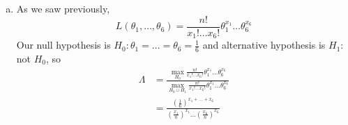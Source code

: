 \begin{enumerate}[a)]
    \item As we saw previously, 
    \[
        L(\theta_1, \dots, \theta_6) = \frac{n!}{x_1! \dots x_6!}\theta_1^{x_1} \dots \theta_6^{x_6}
    \]
    Our null hypothesis is $H_0\colon \theta_1 = \dots = \theta_6 = \frac{1}{6}$ and alternative hypothesis is $H_1\colon $ not $H_0$, so
    \begin{align*}
        \Lambda &= \frac{\max\limits_{H_0} \frac{n!}{x_1! \dots x_6!}\theta_1^{x_1} \dots \theta_6^{x_6}}{\max\limits_{H_0 \cup H_1} \frac{n!}{x_1! \dots x_6!}\theta_1^{x_1} \dots \theta_6^{x_6}} \\
        &= \frac{\left( \frac{1}{6} \right)^{x_1 + \dots + x_6} }{\left( \frac{x_1}{n} \right)^{x_1} \dots \left( \frac{x_6}{n} \right)^{x_6} }
    \end{align*}
\end{enumerate}